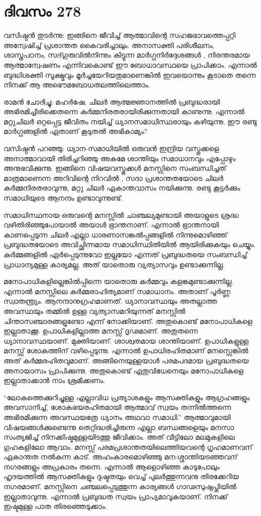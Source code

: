 \section{ദിവസം 278}


വസിഷ്ഠന്‍ തുടര്‍ന്നു: ഇങ്ങിനെ ജീവിച്ച് ആത്മാവിന്റെ സഹജഭാവത്തെപ്പറ്റി അന്വേഷിച്ച് പ്രശാന്തത കൈവരിച്ചാലും. അനാസക്തി പരിശീലനം, ശാസ്ത്രപഠനം, സദ്‌ഗുരുവില്‍നിന്നും കിട്ടുന്ന മാര്‍ഗ്ഗനിര്‍ദ്ദേശങ്ങള്‍ , നിരന്തരമായ ആത്മാന്വേഷണം എന്നിവകൊണ്ട് ഈ ബോധാവസ്ഥയെ പ്രാപിക്കാം. എന്നാല്‍ ബുദ്ധിശക്തി സൂക്ഷ്മവും മൂര്‍ച്ചയേറിയതുമാണെങ്കില്‍ ഇവയൊന്നും കൂടാതെ തന്നെ നിനക്ക് ആ അഭൌമബോധതലത്തിലെത്താം.

രാമന്‍ ചോദിച്ചു: മഹര്‍ഷേ, ചിലര്‍ ആത്മജ്ഞാനത്തില്‍ പ്രബുദ്ധരായി അഭിരമിച്ചിരിക്കെതന്നെ കര്‍മ്മനിരതരായിരിക്കുന്നതായി കാണുന്നു. എന്നാല്‍ മറ്റുചിലര്‍ ഒറ്റപ്പെട്ട ജീവിതം നയിച്ച് ധ്യാനസമാധിസ്ഥരായും കഴിയുന്നു. ഈ രണ്ടു മാര്‍ഗ്ഗങ്ങളില്‍ ഏതാണ് കൂടുതല്‍ അഭികാമ്യം?

വസിഷ്ഠന്‍ പറഞ്ഞു: ധ്യാന-സമാധിയില്‍ ഒരുവന്‍ ഇന്ദ്രിയ വസ്തുക്കളെ അനാത്മാവായി തിരിച്ചറിഞ്ഞു അകമേ ശാന്തിയും സമാധാനവും എപ്പോഴും അനുഭവിക്കുന്നു. ഇങ്ങിനെ വിഷയവസ്തുക്കള്‍ മനസ്സിനെ സംബന്ധിച്ചത് മാത്രമാണെന്ന അറിവിന്റെ നിറവില്‍ , സദാ പ്രശാന്തതയോടെ ചിലര്‍ കര്‍മ്മനിരതരാവുന്നു, മറ്റു ചിലര്‍ ഏകാന്തവാസം നയിക്കുന്നു.  രണ്ടു കൂട്ടര്‍ക്കും സമാധിയുടെ ആനന്ദം ഉണ്ടാവുന്നുണ്ട്.        

സമാധിസ്ഥനായ ഒരുവന്റെ മനസ്സില്‍ ചാഞ്ചല്യമുണ്ടായി അയാളുടെ ശ്രദ്ധ വഴിതിരിഞ്ഞുപോയാല്‍ അയാള്‍ ഭ്രാന്തനാണ്. എന്നാല്‍ ഭ്രാന്തനായി കാണപ്പെടുന്ന ചിലര്‍ എല്ലാ ധാരണാസങ്കല്‍പ്പങ്ങളില്‍ നിന്നുമൊഴിഞ്ഞ് പ്രബുദ്ധതയോടെ അവിച്ഛിന്നമായ സമാധിസ്ഥിതിയില്‍ ആയിരിക്കുകയും ചെയ്യും. കര്‍മ്മങ്ങളില്‍ ഏര്‍പ്പെടുന്നുവോ ഇല്ലയോ എന്നത് പ്രബുദ്ധതയെ സംബന്ധിച്ച് പ്രാധാന്യമുള്ള കാര്യമല്ല. അത് യാതൊരു വ്യത്യാസവും ഉണ്ടാക്കുന്നില്ല.
   
മനോപാധികളില്ലെങ്കില്‍പ്പിന്നെ യാതൊരു കര്‍മ്മവും കളങ്കമുണ്ടാക്കുന്നില്ല. എന്നാല്‍ മനസ്സിലെ കര്‍മ്മരാഹിത്യമാണ് സമാധാനം. അതാണ്‌ പൂര്‍ണ്ണ സ്വാതന്ത്ര്യം. ആനന്ദാനുഗ്രഹമാണത്. ധ്യാനാവസ്ഥയും അതല്ലാത്ത അവസ്ഥയും തമ്മില്‍ ഉള്ള വ്യത്യാസമറിയുന്നത് മനസ്സില്‍ ചിന്താസഞ്ചാരങ്ങളുണ്ടോ എന്ന് നോക്കിയാണ്. അതുകൊണ്ട് മനോപാധികളെ ഇല്ലാതാക്കൂ. ഉപാധികളില്ലാത്ത മനസ്സ് ദൃഢമാണ്. അതുതന്നെ ധ്യാനാവസ്ഥയാണ്. മുക്തിയാണ്. ശാശ്വതമായ ശാന്തിയാണ്. ഉപാധികളുള്ള മനസ്സ് ശോകത്തിന് വഴിപ്പെടുന്നു. എന്നാല്‍ ഉപാധിരഹിതമാണ് മനസ്സെങ്കില്‍ അത് കര്‍മ്മരഹിതവുമാണ്. അങ്ങിനെയുള്ളയാള്‍ പരമപദമായ പ്രബുദ്ധതയെ അനായാസം പ്രാപിക്കുന്നു. അതുകൊണ്ട് ഏതുവിധേനെയും മനോപാധികളെ ഇല്ലാതാക്കാന്‍ നാം ശ്രമിക്കണം.

“ലോകത്തെക്കുറിച്ചുള്ള എല്ലാവിധ പ്രത്യാശകളും ആസക്തികളും ആഗ്രഹങ്ങളും അവസാനിച്ച്, ശോകഭയരഹിതമായി ആത്മാവ് സ്വയം തന്നില്‍ത്തന്നെ അഭിരമിക്കുന്ന അവസ്ഥയത്രേ ധ്യാനം അഥവാ സമാധി.” ആത്മാവുമായി വിഷയങ്ങള്‍ക്കുണ്ടെന്നു തെറ്റിദ്ധരിച്ചിരുന്ന എല്ലാ ബന്ധങ്ങളെയും മനസാ സംത്യജിച്ച് നിനക്കിഷ്ടമുള്ളയിടത്തു ജീവിക്കാം. അത് വീട്ടിലോ മലമുകളിലെ ഗുഹകളിലോ ആവാം. മനസ്സ് പരമപ്രശാന്തതയിലെത്തിയവന്റെ ഗൃഹമാണവന് ഏകാന്തത നല്‍കുന്ന കാട്. അഹംകാരമൊഴിഞ്ഞു മന:ശ്ശാന്തിയടഞ്ഞവന് നഗരങ്ങളും അപ്രകാരം തന്നെ. എന്നാല്‍ ആളൊഴിഞ്ഞ കാടുപോലും ഹൃദയത്തില്‍ ആസക്തികളും ദുഷ്ടതയും  വെച്ച് പുലര്‍ത്തുന്നവനു തിരക്കേറിയ നഗരമാണ്. മനസ്സിനെ ചഞ്ചലപ്പെടുത്തുന്ന കാര്യങ്ങള്‍ ഗാഢസുഷുപ്തിയില്‍ ഇല്ലാതാവുന്നു. എന്നാല്‍ പ്രബുദ്ധത സ്വയം പ്രാപ്യമാവുകയാണ്. നിനക്ക് ഇഷ്ടമുള്ള പാത തിരഞ്ഞെടുക്കാം.